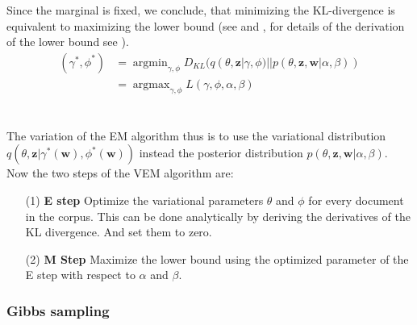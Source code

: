 \documentclass[11pt,a4paper]{article}
\DeclareMathOperator*{\argmin}{argmin}
\DeclareMathOperator*{\argmax}{argmax}
\begin{document}
Since the marginal is fixed, we conclude, that minimizing the KL-divergence is equivalent to maximizing the lower bound (see \cite{Jordan1999} and \cite{Wainwright2008}, for details of the derivation of the lower bound see \cite{Blei2003}).
\begin{align}
(\gamma^*, \phi^*) &= \argmin_{\gamma, \phi}D_{KL}(q(\theta,\textbf{z}|\gamma,\phi)||p(\theta,\textbf{z},\textbf{w}|\alpha,\beta))\\
&= \argmax_{\gamma, \phi} L(\gamma,\phi,\alpha, \beta)
\end{align}\\
\\
The variation of the EM algorithm thus is to use the variational distribution $q(\theta,\textbf{z}|\gamma^*(\textbf{w}), \phi^*(\textbf{w}))$ instead the posterior distribution $p(\theta,\textbf{z},\textbf{w}|\alpha,\beta)$. Now the two steps of the VEM algorithm are:
\begin{itemize}
	\item [(1)]\textbf{E step} Optimize the variational parameters $\theta$ and $\phi$ for every document in the corpus. This can be done analytically by deriving the derivatives of the KL divergence. And set them to zero.
	\item [(2)] \textbf{M Step} Maximize the lower bound using the optimized parameter of the E step with respect to $\alpha$ and $\beta$.
\end{itemize}


\subsubsection{Gibbs sampling}
\end{document}

